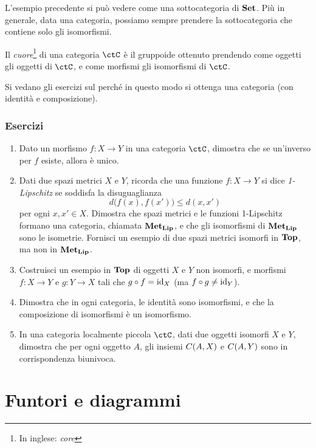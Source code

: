 L'esempio precedente si può vedere come una sottocategoria di $\mathbf{Set}$.
Più in generale, data una categoria, possiamo sempre prendere la sottocategoria che contiene solo gli isomorfismi.

\begin{definition}
 Il \emph{cuore}\footnote{In inglese: \emph{core}} di una categoria $\ctC$ è il gruppoide ottenuto prendendo come oggetti gli oggetti di $\ctC$, e come morfismi gli isomorfismi di $\ctC$.
\end{definition}

Si vedano gli esercizi sul perché in questo modo si ottenga una categoria (con identità e composizione).


\subsubsection*{Esercizi}
\begin{enumerate}
    \item Dato un morfismo $f:X\to Y$ in una categoria $\ctC$, dimostra che se un'inverso per $f$ esiste, allora è unico.
    \item Dati due spazi metrici $X$ e $Y$, ricorda che una funzione $f:X\to Y$ si dice \emph{1-Lipschitz} se soddisfa la disuguaglianza
    \[
     d\big( f(x), f(x') \big) \le d(x,x')
    \]
    per ogni $x,x'\in X$. Dimostra che spazi metrici e le funzioni 1-Lipschitz formano una categoria, chiamata $\mathbf{Met}_{\mathbf{Lip}}$, e che gli isomorfismi di $\mathbf{Met}_{\mathbf{Lip}}$ sono le isometrie. Fornisci un esempio di due spazi metrici isomorfi in $\mathbf{Top}$, ma non in $\mathbf{Met}_{\mathbf{Lip}}$.
    \item Costruisci un esempio in $\mathbf{Top}$ di oggetti $X$ e $Y$ non isomorfi, e morfismi $f:X\to Y$ e $g:Y\to X$ tali che $g\circ f=\mathrm{id}_X$ (ma $f\circ g \ne \mathrm{id}_Y$).
    \item Dimostra che in ogni categoria, le identità sono isomorfismi, e che la composizione di isomorfismi è un isomorfismo.
    \item In una categoria localmente piccola $\ctC$, dati due oggetti isomorfi $X$ e $Y$, dimostra che per ogni oggetto $A$, gli insiemi $C(A,X)$ e $C(A,Y)$ sono in corrispondenza biunivoca.
\end{enumerate}


\section{Funtori e diagrammi}

